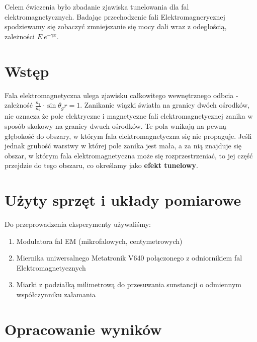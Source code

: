 \documentclass[a4paper,12pt]{article}
\begin{document}
Celem ćwiczenia było zbadanie zjawiska tunelowania dla fal elektromagnetycznych. Badając przechodzenie fali Elektromagnerycznej spodziewamy się zobaczyć zmniejszanie się mocy dali wraz z odegłością, zależności $E~e^{-\gamma x}$. 

\section{Wstęp}

Fala elektromagnetyczna ulega zjawisku całkowitego wewnętrznego odbcia - zależność $\frac{n_1}{n_2}\cdot \sin \theta_gr = 1 $. Zanikanie wiązki światła na granicy dwóch ośrodków, nie oznacza że pole elektryczne i magnetyczne fali elektromagnetycznej zanika w sposób skokowy na granicy dwuch ośrodków. Te pola wnikają na pewną głębokość do obszary, w którym fala elektromagnetyczna się nie propaguje. 
Jeśli jednak grubość warstwy w której pole zanika jest mała, a za nią znajduje się obszar, w którym fala elektromagnetyczna może się rozprzestrzeniać, to jej część przejdzie do tego obszaru, co określamy jako \textbf{efekt tunelowy}.

\section{Użyty sprzęt i układy pomiarowe}

Do przeprowadzenia eksperymenty używaliśmy: 

\begin{enumerate}
  \item Modulatora fal EM (mikrofalowych, centymetrowych) 
  \item Miernika uniwersalnego Metatronik V640 połączonego z odniornikiem fal Elektromagnetycznych
  \item Miarki z podziałką milimetrową do przesuwania sunstancji o odmiennym współczynniku załamania
  
\end{enumerate}


\section{Opracowanie wyników}
\end{document}
